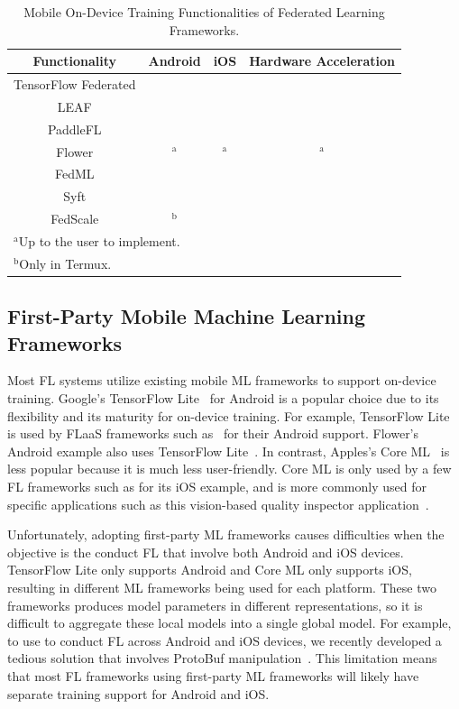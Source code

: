 \documentclass[conference]{IEEEtran}
\newcommand{\cmark}{\ding{51}}
\newcommand{\xmark}{\ding{55}}
\begin{document}
\begin{table}
\caption{Mobile On-Device Training Functionalities of
    Federated Learning Frameworks.
}
\begin{center}
\begin{tabular}{cccc}
    Functionality&Android&iOS&Hardware Acceleration\\
    \hline
    TensorFlow Federated&\xmark&\xmark&\xmark\\
    LEAF&\xmark&\xmark&\xmark\\
    PaddleFL&\xmark&\xmark&\xmark\\
    Flower&\cmark$^\mathrm{a}$&\cmark$^\mathrm{a}$&\cmark$^\mathrm{a}$\\
    FedML&\cmark&\xmark&\cmark\\
    Syft&\cmark&\cmark&\xmark\\
    FedScale&\cmark$^\mathrm{b}$&\xmark&\cmark\\
    \multicolumn{4}{l}{$^{\mathrm{a}}$Up to the user to implement.}\\
    \multicolumn{4}{l}{$^{\mathrm{b}}$Only in Termux.}
\end{tabular}
\label{tab:on-device}
\end{center}
\end{table}
\subsection{First-Party Mobile Machine Learning Frameworks}

Most FL systems utilize existing mobile ML frameworks to
support on-device training.
Google's TensorFlow Lite~\cite{tensorflow2015-whitepaper,abadi2016tensorflow}
for Android is
a popular choice due to its flexibility and
its maturity for on-device training.
For example, TensorFlow Lite is used by FLaaS frameworks such as~\cite{
    kourtellis2020flaas,katevas2022flaas}
for their Android support.
Flower's Android example also uses
TensorFlow Lite~\cite{beutel2020flower,mathur2021ondevice}.
In contrast, Apples's Core ML~\cite{coreml} is less popular because
it is much less user-friendly.
Core ML is only used by a few FL frameworks such as
\Flower{} for its iOS example,
and is more commonly used for specific applications
such as this vision-based quality inspector application~\cite{bharti2022edge}.

Unfortunately, adopting first-party ML frameworks causes difficulties when
the objective is the conduct FL that involve both Android and iOS devices.
TensorFlow Lite only supports Android and
Core ML only supports iOS,
resulting in different ML frameworks being used for each platform.
These two frameworks produces model parameters in different representations,
so it is difficult to aggregate these local models into a single global model.
For example, to use \Flower{} to conduct FL across Android and iOS devices,
we recently developed a tedious solution that involves
ProtoBuf manipulation~\cite{he2023fedkit}.
This limitation means that most FL frameworks using first-party ML frameworks
will likely have separate training support for Android and iOS.
\end{document}
